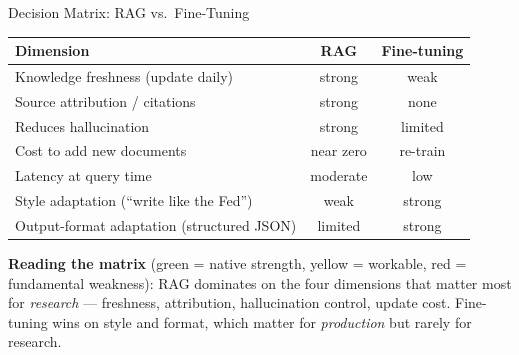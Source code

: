 \begin{frame}{Decision Matrix: RAG vs.\ Fine-Tuning}
\begin{center}
\renewcommand{\arraystretch}{1.1}
\small
\begin{tabular}{|p{4.6cm}|c|c|}
\hline
\textbf{Dimension} & \textbf{RAG} & \textbf{Fine-tuning} \\
\hline
Knowledge freshness (update daily) & \cellcolor{green!35}strong & \cellcolor{red!30}weak \\
\hline
Source attribution / citations & \cellcolor{green!35}strong & \cellcolor{red!30}none \\
\hline
Reduces hallucination & \cellcolor{green!35}strong & \cellcolor{yellow!45}limited \\
\hline
Cost to add new documents & \cellcolor{green!35}near zero & \cellcolor{red!30}re-train \\
\hline
Latency at query time & \cellcolor{yellow!45}moderate & \cellcolor{green!35}low \\
\hline
Style adaptation (``write like the Fed'') & \cellcolor{red!30}weak & \cellcolor{green!35}strong \\
\hline
Output-format adaptation (structured JSON) & \cellcolor{yellow!45}limited & \cellcolor{green!35}strong \\
\hline
\end{tabular}
\end{center}

\smallskip
\textbf{Reading the matrix} (green = native strength, yellow = workable, red = fundamental weakness): RAG dominates on the four dimensions that matter most for \emph{research} --- freshness, attribution, hallucination control, update cost. Fine-tuning wins on style and format, which matter for \emph{production} but rarely for research.
\end{frame}

